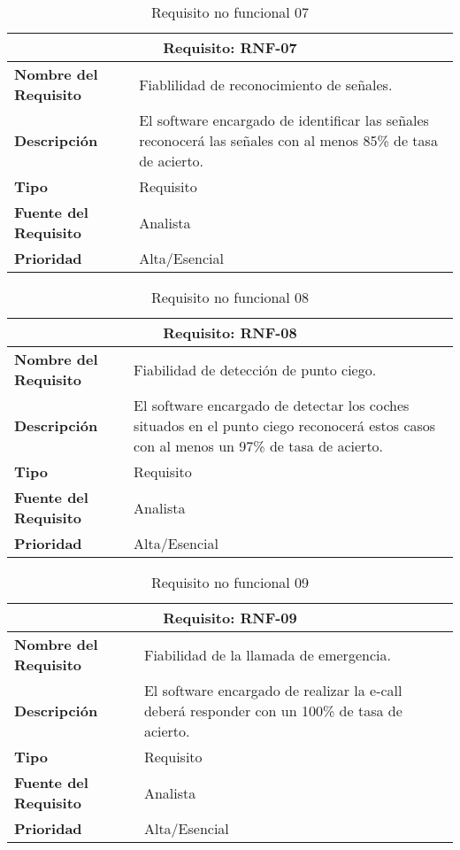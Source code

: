 \begin{table}[H]
\begin{center}
\begin{tabular}{p{} p{7cm}}
\multicolumn{2}{c}{\textbf{Requisito: RNF-07} } \\
\hline \hline
\textbf{Nombre del Requisito} & Fiablilidad de reconocimiento de señales.\\
\hline
\textbf{Descripción} &  El software encargado de identificar las señales reconocerá las señales con al menos 85\% de tasa de acierto.\\
\hline
\textbf{Tipo} & Requisito  \\
\hline
\textbf{Fuente del Requisito} & Analista  \\
\hline
\textbf{Prioridad} & Alta/Esencial \\ \hline
\end{tabular}
\caption{Requisito no funcional 07}
\label{tab:RNF-07}
\end{center}
\end{table}

\begin{table}[H]
\begin{center}
\begin{tabular}{p{} p{7cm}}
\multicolumn{2}{c}{\textbf{Requisito: RNF-08} } \\
\hline \hline
\textbf{Nombre del Requisito} & Fiabilidad de detección de punto ciego.\\
\hline
\textbf{Descripción} & El software encargado de detectar los coches situados en el punto ciego reconocerá estos casos con al menos un 97\% de tasa de acierto.\\
\hline
\textbf{Tipo} & Requisito  \\
\hline
\textbf{Fuente del Requisito} & Analista  \\
\hline
\textbf{Prioridad} & Alta/Esencial \\ \hline
\end{tabular}
\caption{Requisito no funcional 08}
\label{tab:RNF-08}
\end{center}
\end{table}

\begin{table}[H]
\begin{center}
\begin{tabular}{p{} p{7cm}}
\multicolumn{2}{c}{\textbf{Requisito: RNF-09} } \\
\hline \hline
\textbf{Nombre del Requisito} & Fiabilidad de la llamada de emergencia.\\
\hline
\textbf{Descripción} & El software encargado de realizar la e-call deberá responder con un 100\% de tasa de acierto.\\
\hline
\textbf{Tipo} & Requisito  \\
\hline
\textbf{Fuente del Requisito} & Analista  \\
\hline
\textbf{Prioridad} & Alta/Esencial \\ \hline
\end{tabular}
\caption{Requisito no funcional 09}
\label{tab:RNF-09}
\end{center}
\end{table}

